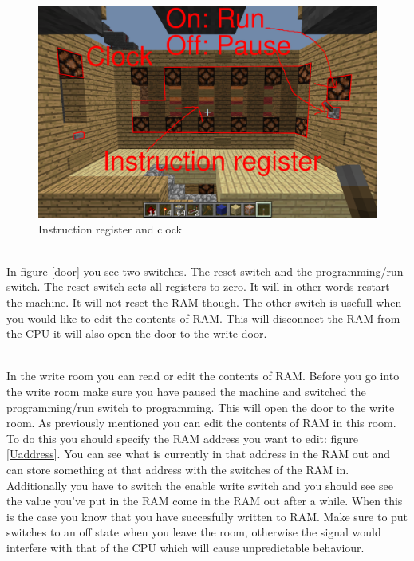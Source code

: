 \documentclass{article}
\begin{document}
\begin{figure}[H]
	\centering
	\includegraphics[width=\textwidth]{UI clock.png}
	\caption{Instruction register and clock\label{Uclock}}
\end{figure}
~\\
In figure \ref{door} you see two switches. The reset switch and the programming/run switch. The reset switch sets all registers to zero. It will in other words restart the machine. It will not reset the RAM though. The other switch is usefull when you would like to edit the contents of RAM. This will disconnect the RAM from the CPU it will also open the door to the write door.

~\\
In the write room you can read or edit the contents of RAM. Before you go into the write room make sure you have paused the machine and switched the programming/run switch to programming. This will open the door to the write room. As previously mentioned you can edit the contents of RAM in this room. To do this you should specify the RAM address you want to edit: figure \ref{Uaddress}. You can see what is currently in that address in the RAM out and can store something at that address with the switches of the RAM in. Additionally you have to switch the enable write switch and you should see see the value you've put in the RAM come in the RAM out after a while. When this is the case you know that you have succesfully written to RAM. Make sure to put switches to an off state when you leave the room, otherwise the signal would interfere with that of the CPU which will cause unpredictable behaviour.
\end{document}
